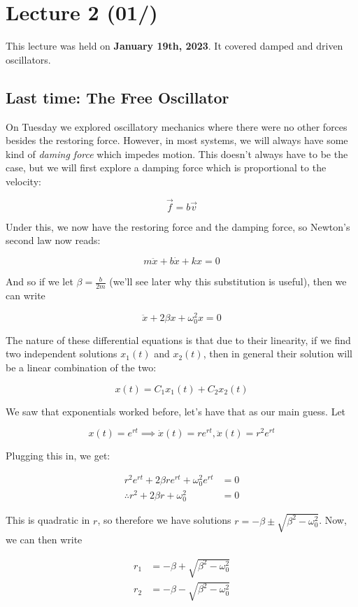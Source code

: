 \chapter{Lecture 2 (01/)}

This lecture was held on \textbf{January 19th, 2023}. It covered damped and driven oscillators.

\section{Last time: The Free Oscillator}

On Tuesday we explored oscillatory mechanics where there were no other forces besides the restoring force. However, in most systems, we will always have some kind of \textit{daming force} which impedes motion. This doesn't always have to be the case, but we will first explore a damping force which is proportional to the velocity: 

\[ \vec f = b \vec v\]

Under this, we now have the restoring force and the damping force, so Newton's second law now reads: 

\[ m \ddot x + b \dot x + kx = 0\] 

And so if we let $\beta = \frac{b}{2m}$ (we'll see later why this substitution is useful), then we can write

\[ \ddot x + 2\beta x + \omega_0^2 x = 0\]

The nature of these differential equations is that due to their linearity, if we find two independent solutions $x_1(t)$ and $x_2(t)$, then in general their solution will be a linear combination of the two: 

\[ x(t) = C_1x_1(t) + C_2x_2(t)\] 

We saw that exponentials worked before, let's have that as our main guess. Let 

\[ x(t) = e^{rt} \implies \dot x(t) = re^{rt}, \ddot x(t) = r^2e^{rt}\] 

Plugging this in, we get: 

\begin{align*}
    r^2e^{rt} + 2\beta r e^{rt} + \omega_0^2e^{rt} &= 0\\
    \therefore r^2 + 2\beta r + \omega_0^2 &= 0
\end{align*}

This is quadratic in $r$, so therefore we have solutions $r = -\beta \pm \sqrt{\beta^2 - \omega_0^2}$. Now, we can then write

\begin{align*}
    r_1 &= -\beta + \sqrt{\beta^2 - \omega_0^2}\\
    r_2 &= -\beta - \sqrt{\beta^2 - \omega_0^2}
\end{align*}

